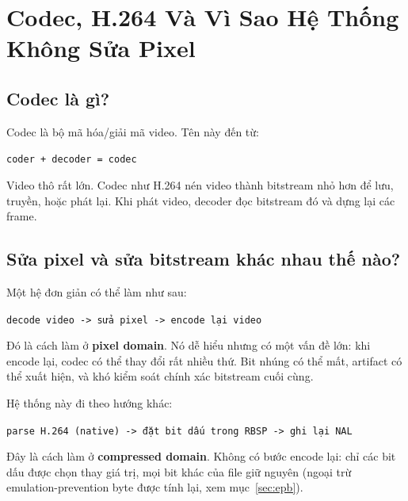\documentclass[11pt,a4paper]{article}
\begin{document}
\section{Codec, H.264 Và Vì Sao Hệ Thống Không Sửa Pixel}

\subsection{Codec là gì?}

Codec là bộ mã hóa/giải mã video. Tên này đến từ:

\begin{center}
\texttt{coder + decoder = codec}
\end{center}

Video thô rất lớn. Codec như H.264 nén video thành bitstream nhỏ hơn để lưu,
truyền, hoặc phát lại. Khi phát video, decoder đọc bitstream đó và dựng lại
các frame.

\subsection{Sửa pixel và sửa bitstream khác nhau thế nào?}

Một hệ đơn giản có thể làm như sau:

\begin{center}
\texttt{decode video -> sửa pixel -> encode lại video}
\end{center}

Đó là cách làm ở \textbf{pixel domain}. Nó dễ hiểu nhưng có một vấn đề lớn:
khi encode lại, codec có thể thay đổi rất nhiều thứ. Bit nhúng có thể mất,
artifact có thể xuất hiện, và khó kiểm soát chính xác bitstream cuối cùng.

Hệ thống này đi theo hướng khác:

\begin{center}
\texttt{parse H.264 (native) -> đặt bit dấu trong RBSP -> ghi lại NAL}
\end{center}

Đây là cách làm ở \textbf{compressed domain}. Không có bước encode lại: chỉ các
bit dấu được chọn thay giá trị, mọi bit khác của file giữ nguyên (ngoại trừ
emulation-prevention byte được tính lại, xem mục~\ref{sec:epb}).
\end{document}
